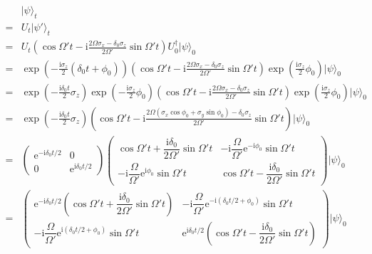 \documentclass[10pt,fleqn]{article}
\newcommand{\ue}{\mathrm{e}}
\newcommand{\ui}{\mathrm{i}}
\newcommand{\eqar}[1]
{
  \begin{align*}
    #1
  \end{align*}
}
\newcommand{\paren}[1]{{\left({#1}\right)}}
\begin{document}
\eqar{
  &|\psi\rangle_t\\
  =&U_t|\psi'\rangle_t\\
  =&U_t\paren{\cos\Omega't-\ui\frac{2\Omega\sigma_x-\delta_0\sigma_z}{2\Omega'}\sin\Omega't}U_0^\dagger|\psi\rangle_0\\
  =&\exp\paren{-\frac{\ui\sigma_z}2\paren{\delta_0t+\phi_0}}\paren{\cos\Omega't-\ui\frac{2\Omega\sigma_x-\delta_0\sigma_z}{2\Omega'}\sin\Omega't}\exp\paren{\frac{\ui\sigma_z}2\phi_0}|\psi\rangle_0\\
  =&\exp\paren{-\frac{\ui\delta_0t}2\sigma_z}\exp\paren{-\frac{\ui\sigma_z}2\phi_0}\paren{\cos\Omega't-\ui\frac{2\Omega\sigma_x-\delta_0\sigma_z}{2\Omega'}\sin\Omega't}\exp\paren{\frac{\ui\sigma_z}2\phi_0}|\psi\rangle_0\\
  =&\exp\paren{-\frac{\ui\delta_0t}2\sigma_z}\paren{\cos\Omega't-\ui\frac{2\Omega\paren{\sigma_x\cos\phi_0+\sigma_y\sin\phi_0}-\delta_0\sigma_z}{2\Omega'}\sin\Omega't}|\psi\rangle_0\\
  =&\begin{pmatrix}
    \ue^{-\ui\delta_0t/2}&0\\
    0&\ue^{\ui\delta_0t/2}
  \end{pmatrix}\begin{pmatrix}
    \cos\Omega't+\dfrac{\ui\delta_0}{2\Omega'}\sin\Omega't&-\ui\dfrac{\Omega}{\Omega'}\ue^{-\ui\phi_0}\sin\Omega't\\
    -\ui\dfrac{\Omega}{\Omega'}\ue^{\ui\phi_0}\sin\Omega't&\cos\Omega't-\dfrac{\ui\delta_0}{2\Omega'}\sin\Omega't
  \end{pmatrix}|\psi\rangle_0\\
  =&\begin{pmatrix}
    \ue^{-\ui\delta_0t/2}\paren{\cos\Omega't+\dfrac{\ui\delta_0}{2\Omega'}\sin\Omega't}&-\ui\dfrac{\Omega}{\Omega'}\ue^{-\ui\paren{\delta_0t/2+\phi_0}}\sin\Omega't\\
    -\ui\dfrac{\Omega}{\Omega'}\ue^{\ui\paren{\delta_0t/2+\phi_0}}\sin\Omega't&\ue^{\ui\delta_0t/2}\paren{\cos\Omega't-\dfrac{\ui\delta_0}{2\Omega'}\sin\Omega't}
  \end{pmatrix}|\psi\rangle_0
}
\end{document}
